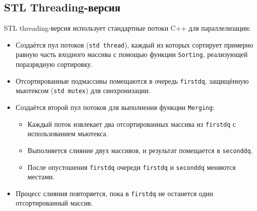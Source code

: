 \documentclass[a4paper,12pt]{article}
\begin{document}
\subsection{STL Threading-версия}
STL threading-версия использует стандартные потоки C++ для параллелизации:
\begin{itemize}
    \item Создаётся пул потоков (\texttt{std thread}), каждый из которых сортирует примерно равную часть входного массива с помощью функции \texttt{Sorting}, реализующей поразрядную сортировку.
    \item Отсортированные подмассивы помещаются в очередь \texttt{firstdq}, защищённую мьютексом (\texttt{std mutex}) для синхронизации.
    \item Создаётся второй пул потоков для выполнения функции \texttt{Merging}:
        \begin{itemize}
            \item Каждый поток извлекает два отсортированных массива из \texttt{firstdq} с использованием мьютекса.
            \item Выполняется слияние двух массивов, и результат помещается в \texttt{seconddq}.
            \item После опустошения \texttt{firstdq} очереди \texttt{firstdq} и \texttt{seconddq} меняются местами.
        \end{itemize}
    \item Процесс слияния повторяется, пока в \texttt{firstdq} не останется один отсортированный массив.
\end{itemize}
\end{document}
